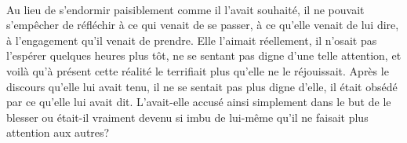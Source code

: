 \paragraph{}
Au lieu de s'endormir paisiblement comme il l'avait souhaité, il ne pouvait
s'empêcher de réfléchir à ce qui venait de se passer, à ce qu'elle venait de
lui dire, à l'engagement qu'il venait de prendre. Elle l'aimait réellement, il
n'osait pas l'espérer quelques heures plus tôt, ne se sentant pas digne d'une
telle attention, et voilà qu'à présent cette réalité le terrifiait plus
qu'elle ne le réjouissait. Après le discours qu'elle lui avait tenu, il ne
se sentait pas plus digne d'elle, il était obsédé par ce qu'elle lui avait
dit. L'avait-elle accusé ainsi simplement dans le but de le blesser ou
était-il vraiment devenu si imbu de lui-même qu'il ne faisait plus attention
aux autres?

\contextswitch